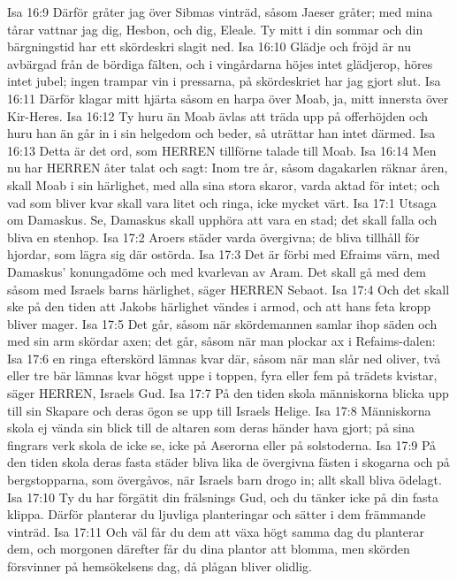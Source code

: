 Isa 16:9  Därför gråter jag över Sibmas vinträd, såsom Jaeser gråter; med mina tårar vattnar jag dig, Hesbon, och dig, Eleale. Ty mitt i din sommar och din bärgningstid har ett skördeskri slagit ned.
Isa 16:10  Glädje och fröjd är nu avbärgad från de bördiga fälten, och i vingårdarna höjes intet glädjerop, höres intet jubel; ingen trampar vin i pressarna, på skördeskriet har jag gjort slut.
Isa 16:11  Därför klagar mitt hjärta såsom en harpa över Moab, ja, mitt innersta över Kir-Heres.
Isa 16:12  Ty huru än Moab ävlas att träda upp på offerhöjden och huru han än går in i sin helgedom och beder, så uträttar han intet därmed.
Isa 16:13  Detta är det ord, som HERREN tillförne talade till Moab.
Isa 16:14  Men nu har HERREN åter talat och sagt: Inom tre år, såsom dagakarlen räknar åren, skall Moab i sin härlighet, med alla sina stora skaror, varda aktad för intet; och vad som bliver kvar skall vara litet och ringa, icke mycket värt.
Isa 17:1  Utsaga om Damaskus. Se, Damaskus skall upphöra att vara en stad; det skall falla och bliva en stenhop.
Isa 17:2  Aroers städer varda övergivna; de bliva tillhåll för hjordar, som lägra sig där ostörda.
Isa 17:3  Det är förbi med Efraims värn, med Damaskus' konungadöme och med kvarlevan av Aram. Det skall gå med dem såsom med Israels barns härlighet, säger HERREN Sebaot.
Isa 17:4  Och det skall ske på den tiden att Jakobs härlighet vändes i armod, och att hans feta kropp bliver mager.
Isa 17:5  Det går, såsom när skördemannen samlar ihop säden och med sin arm skördar axen; det går, såsom när man plockar ax i Refaims-dalen:
Isa 17:6  en ringa efterskörd lämnas kvar där, såsom när man slår ned oliver, två eller tre bär lämnas kvar högst uppe i toppen, fyra eller fem på trädets kvistar, säger HERREN, Israels Gud.
Isa 17:7  På den tiden skola människorna blicka upp till sin Skapare och deras ögon se upp till Israels Helige.
Isa 17:8  Människorna skola ej vända sin blick till de altaren som deras händer hava gjort; på sina fingrars verk skola de icke se, icke på Aserorna eller på solstoderna.
Isa 17:9  På den tiden skola deras fasta städer bliva lika de övergivna fästen i skogarna och på bergstopparna, som övergåvos, när Israels barn drogo in; allt skall bliva ödelagt.
Isa 17:10  Ty du har förgätit din frälsnings Gud, och du tänker icke på din fasta klippa. Därför planterar du ljuvliga planteringar och sätter i dem främmande vinträd.
Isa 17:11  Och väl får du dem att växa högt samma dag du planterar dem, och morgonen därefter får du dina plantor att blomma, men skörden försvinner på hemsökelsens dag, då plågan bliver olidlig.
